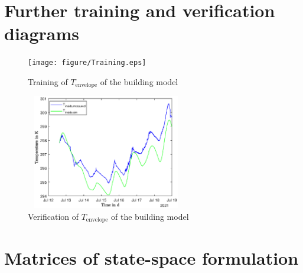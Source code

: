 \section{Further training and verification diagrams}
\label{sec:appendix:Modelvalues}
\begin{figure}[h]
            \centering
            \texttt{[image: figure/Training.eps]}
           \caption{Training of $T_\text{envelope}$ of the building model}
           \label{fig:trainingModelenvelope}
    \end{figure}
    \begin{figure}[h]
            \centering
            \includegraphics[width=7cm,height=5cm]{figure/Validation_inside.eps}
           \caption{Verification of $T_\text{envelope}$ of the building model}
           \label{fig:verificationModelenvelpe}
    \end{figure}
    
\section{Matrices of state-space formulation}
\label{sec:appendix:Matrizen}
    
